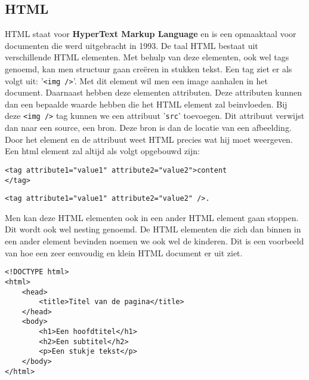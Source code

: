 \subsection{HTML}
HTML staat voor \textbf{HyperText Markup Language} en is een opmaaktaal voor documenten die werd uitgebracht in 1993. De taal HTML bestaat uit verschillende HTML elementen. Met behulp van deze elementen, ook wel tags genoemd, kan men structuur gaan creëren in stukken tekst. Een tag ziet er als volgt uit: '\lstinline[basicstyle=\ttfamily\color{red}]|<img />|'. Met dit element wil men een image aanhalen in het document. Daarnaast hebben deze elementen attributen. Deze attributen kunnen dan een bepaalde waarde hebben die het HTML element zal beinvloeden. Bij deze \lstinline[basicstyle=\ttfamily\color{red}]|<img />| tag kunnen we een attribuut '\lstinline[basicstyle=\ttfamily\color{red}]|src|' toevoegen. Dit attribuut verwijst dan naar een source, een bron. Deze bron is dan de locatie van een afbeelding. Door het element en de attribuut weet HTML precies wat hij moet weergeven. Een html element zal altijd als volgt opgebouwd zijn: 

\begin{lstlisting}[frame=single, caption=HTML Element voorbeeld]
<tag attribute1="value1" attribute2="value2">content
</tag>
\end{lstlisting}
\begin{lstlisting}[frame=single, caption=HTML Element voorbeeld]
<tag attribute1="value1" attribute2="value2" />.
\end{lstlisting}

Men kan deze HTML elementen ook in een ander HTML element gaan stoppen. Dit wordt ook wel nesting genoemd. De HTML elementen die zich dan binnen in een ander element bevinden noemen we ook wel de kinderen. Dit is een voorbeeld van hoe een zeer eenvoudig en klein HTML document er uit ziet.

\begin{lstlisting}[frame=single, caption=Voorbeeld van een HTML bestand]
<!DOCTYPE html>
<html>
	<head>
		<title>Titel van de pagina</title>
	</head>
	<body>
		<h1>Een hoofdtitel</h1>
		<h2>Een subtitel</h2>
		<p>Een stukje tekst</p>
	</body>
</html>
\end{lstlisting}

